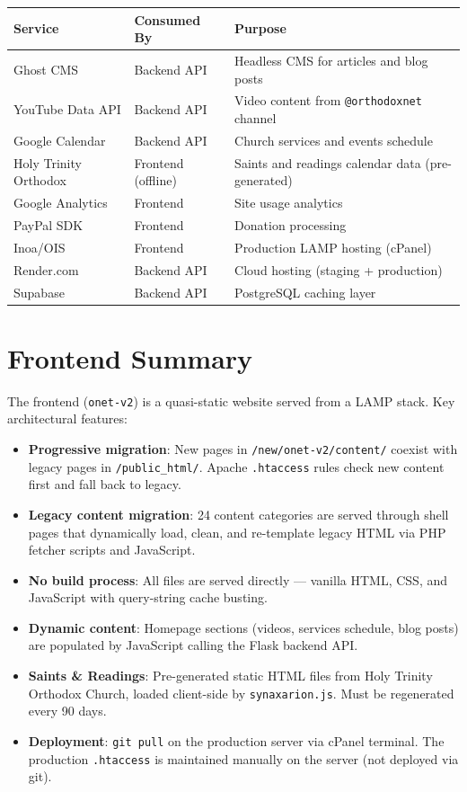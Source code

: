 \documentclass[12pt]{article}
\begin{document}
\begin{longtable}{p{3cm}p{3cm}p{6.5cm}}
\toprule
\textbf{Service} & \textbf{Consumed By} & \textbf{Purpose} \\
\midrule
Ghost CMS & Backend API & Headless CMS for articles and blog posts \\
YouTube Data API & Backend API & Video content from \texttt{@orthodoxnet} channel \\
Google Calendar & Backend API & Church services and events schedule \\
Holy Trinity Orthodox & Frontend (offline) & Saints and readings calendar data (pre-generated) \\
Google Analytics & Frontend & Site usage analytics \\
PayPal SDK & Frontend & Donation processing \\
Inoa/OIS & Frontend & Production LAMP hosting (cPanel) \\
Render.com & Backend API & Cloud hosting (staging + production) \\
Supabase & Backend API & PostgreSQL caching layer \\
\bottomrule
\end{longtable}

\section{Frontend Summary}

The frontend (\texttt{onet-v2}) is a quasi-static website served from a LAMP stack. Key architectural features:

\begin{itemize}
    \item \textbf{Progressive migration}: New pages in \texttt{/new/onet-v2/content/} coexist with legacy pages in \texttt{/public\_html/}. Apache \texttt{.htaccess} rules check new content first and fall back to legacy.
    \item \textbf{Legacy content migration}: 24 content categories are served through shell pages that dynamically load, clean, and re-template legacy HTML via PHP fetcher scripts and JavaScript.
    \item \textbf{No build process}: All files are served directly --- vanilla HTML, CSS, and JavaScript with query-string cache busting.
    \item \textbf{Dynamic content}: Homepage sections (videos, services schedule, blog posts) are populated by JavaScript calling the Flask backend API.
    \item \textbf{Saints \& Readings}: Pre-generated static HTML files from Holy Trinity Orthodox Church, loaded client-side by \texttt{synaxarion.js}. Must be regenerated every 90 days.
    \item \textbf{Deployment}: \texttt{git pull} on the production server via cPanel terminal. The production \texttt{.htaccess} is maintained manually on the server (not deployed via git).
\end{itemize}
\end{document}
